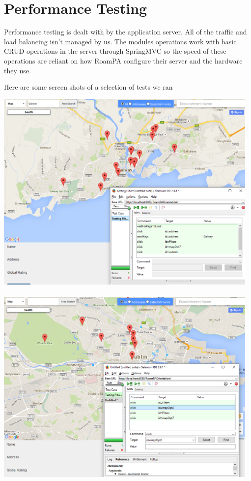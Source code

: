 \section{Performance Testing}

Performance testing is dealt with by the application server. All of the traffic and load balancing isn't managed by us. The modules operations work with basic CRUD operations in the server through SpringMVC so the speed of these operations are reliant on how RoamPA configure their server and the hardware they use. \newline \newline 

\noindent Here are some screen shots of a selection of tests we ran

\begin{center}    
	\includegraphics[height=10cm, width=13cm]{img/seleniumtest.png}
\end{center}

\begin{center}    
	\includegraphics[height=10cm, width=13cm]{img/seleniumtestfilters.png}
\end{center}


